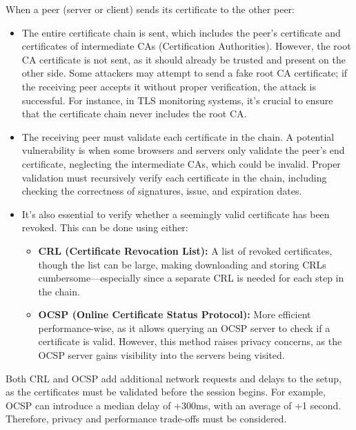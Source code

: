 When a peer (server or client) sends its certificate to the other peer:
\begin{itemize}
    \item The entire certificate chain is sent, which includes the
      peer’s certificate and certificates of intermediate CAs
      (Certification Authorities). However, the root CA certificate is
      not sent, as it should already be trusted and present on the
      other side. Some attackers may attempt to send a fake root CA
      certificate; if the receiving peer accepts it without proper
      verification, the attack is successful. For instance, in TLS
      monitoring systems, it’s crucial to ensure that the certificate
      chain never includes the root CA.
  
    \item The receiving peer must validate each certificate in the
      chain. A potential vulnerability is when some browsers and
      servers only validate the peer's end certificate, neglecting the
      intermediate CAs, which could be invalid. Proper validation must
      recursively verify each certificate in the chain, including
      checking the correctness of signatures, issue, and expiration
      dates.
  
    \item It’s also essential to verify whether a seemingly valid
      certificate has been revoked. This can be done using either:
    \begin{itemize}
        \item \textbf{CRL (Certificate Revocation List):} A list of
          revoked certificates, though the list can be large, making
          downloading and storing CRLs cumbersome—especially since a
          separate CRL is needed for each step in the chain.
        \item \textbf{OCSP (Online Certificate Status Protocol):} More
          efficient performance-wise, as it allows querying an OCSP
          server to check if a certificate is valid. However, this
          method raises privacy concerns, as the OCSP server gains
          visibility into the servers being visited.
    \end{itemize}
\end{itemize}

Both CRL and OCSP add additional network requests and delays to the
setup, as the certificates must be validated before the session
begins. For example, OCSP can introduce a median delay of +300ms, with
an average of +1 second. Therefore, privacy and performance trade-offs
must be considered.

